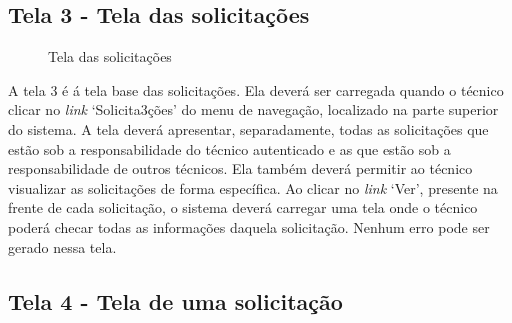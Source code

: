 \newpage

\subsection{Tela 3 - Tela das solicitações}

\begin{figure}[ht]
    \centering
    \caption{Tela das solicitações}
\end{figure}

A tela 3 é á tela base das solicitações. Ela deverá ser carregada quando o técnico clicar no \textit{link} ‘Solicita3ções’ do menu de navegação, localizado na parte superior do sistema. A tela deverá apresentar, separadamente, todas as solicitações que estão sob a responsabilidade do técnico autenticado e as que estão sob a responsabilidade de outros técnicos. Ela também deverá permitir ao técnico visualizar as solicitações de forma específica. Ao clicar no \textit{link} ‘Ver’, presente na frente de cada solicitação, o sistema deverá carregar uma tela onde o técnico poderá checar todas as informações daquela solicitação. Nenhum erro pode ser gerado nessa tela.

\newpage

\subsection{Tela 4 - Tela de uma solicitação}

